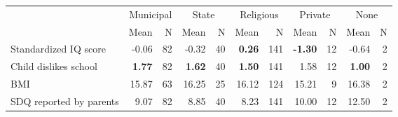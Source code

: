 \begin{tabular}{l r r r r r r r r r r}
\toprule
& \multicolumn{2}{c}{Municipal} & \multicolumn{2}{c}{State} & \multicolumn{2}{c}{Religious} & \multicolumn{2}{c}{Private} & \multicolumn{2}{c}{None} \\
& \scriptsize Mean & \scriptsize N & \scriptsize Mean & \scriptsize N & \scriptsize Mean & \scriptsize N & \scriptsize Mean & \scriptsize N & \scriptsize Mean & \scriptsize N \\
\midrule
Standardized IQ score &     -0.06 &        82 &     -0.32 &        40 & \textbf{     0.26} &       141 & \textbf{    -1.30} &        12 &     -0.64 &         2 \\
Child dislikes school & \textbf{     1.77} &        82 & \textbf{     1.62} &        40 & \textbf{     1.50} &       141 &      1.58 &        12 & \textbf{     1.00} &         2 \\
BMI &     15.87 &        63 &     16.25 &        25 &     16.12 &       124 &     15.21 &         9 &     16.38 &         2 \\
SDQ reported by parents &      9.07 &        82 &      8.85 &        40 &      8.23 &       141 &     10.00 &        12 &     12.50 &         2 \\
\bottomrule
\end{tabular}
